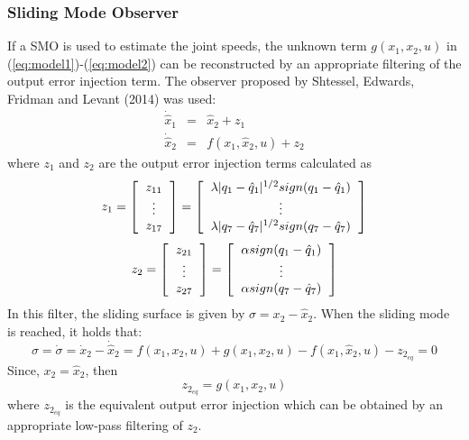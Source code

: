 \documentclass[9pt,spanish,aspectratio=1610]{beamer}
\begin{document}
\begin{frame}\frametitle{Sliding Mode Observer}
  If a SMO is used to estimate the joint speeds, the unknown term $g(x_1, x_2, u)$ in (\ref{eq:model1})-(\ref{eq:model2}) can be reconstructed by an appropriate filtering of the output error injection term. The observer proposed by Shtessel, Edwards, Fridman and Levant (2014) was used:
  \begin{eqnarray}
    \dot{\hat{x}}_1 &=& \hat{x}_2 + z_1\label{eq:observer1}\\
    \dot{\hat{x}}_2 &=& f(x_1, \hat{x}_2, u) + z_2\label{eq:observer2}
  \end{eqnarray}
  where $z_1$ and $z_2$ are the output error injection terms calculated as
  \begin{equation*}z_1 =
    \left[\begin{tabular}{c}
        $z_{11}$\\
        $\vdots$\\
        $z_{17}$
    \end{tabular}\right] = 
    \left[\begin{tabular}{c}
        $\lambda\vert q_1 - \hat{q}_1\vert ^{1/2}sign(q_1 - \hat{q}_1)$ \\
        $\vdots$\\
        $\lambda\vert q_7 - \hat{q}_7\vert ^{1/2}sign(q_7 - \hat{q}_7)$
    \end{tabular}\right]
\end{equation*}
\begin{equation*}z_2 =
  \left[\begin{tabular}{c}
      $z_{21}$\\
      $\vdots$\\
      $z_{27}$
    \end{tabular}\right] = 
  \left[\begin{tabular}{c}
      $\alpha sign(q_1 - \hat{q}_1)$ \\
      $\vdots$\\
      $\alpha sign(q_7 - \hat{q}_7)$
    \end{tabular}\right]
\end{equation*}
In this filter, the sliding surface is given by $\sigma = x_2 - \hat{x}_2$. When the sliding mode is reached, it holds that:
\[\sigma = \dot{\sigma} = \dot{x}_2 - \dot{\hat{x}}_2 = f(x_1, x_2, u) + g(x_1, x_2, u) - f(x_1, \hat{x}_2, u) - z_{2_{eq}} = 0\]
Since,  $x_2 = \hat{x}_2$, then
\begin{equation*}
  z_{2_{eq}} = g(x_1, x_2, u)
\end{equation*}
where $z_{2_{eq}}$ is the equivalent output error injection which can be obtained by an appropriate low-pass filtering of $z_2$. 
\end{frame}
\end{document}
